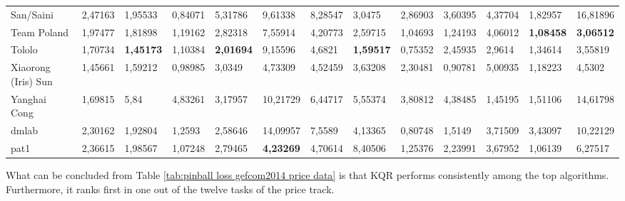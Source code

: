 \begin{table}[!ht]
\begin{adjustbox}{width=\textwidth}
\begin{tabular}{lllllllllllll}
  San/Saini                  & 2,47163          & 1,95533          & 0,84071 & 5,31786          & 9,61338          & 8,28547          & 3,0475           & 2,86903          & 3,60395          & 4,37704          & 1,82957          & 16,81896         \\
  Team Poland                & 1,97477          & 1,81898          & 1,19162          & 2,82318          & 7,55914          & 4,20773          & 2,59715          & 1,04693          & 1,24193          & 4,06012          & \textbf{1,08458} & \textbf{3,06512} \\
  Tololo                     & 1,70734          & \textbf{1,45173} & 1,10384          & \textbf{2,01694} & 9,15596          & 4,6821           & \textbf{1,59517} & 0,75352          & 2,45935          & 2,9614           & 1,34614          & 3,55819          \\
  Xiaorong (Iris) Sun        & 1,45661          & 1,59212          & 0,98985          & 3,0349           & 4,73309          & 4,52459          & 3,63208          & 2,30481          & 0,90781          & 5,00935          & 1,18223          & 4,5302           \\
  Yanghai Cong               & 1,69815          & 5,84             & 4,83261          & 3,17957          & 10,21729         & 6,44717          & 5,55374          & 3,80812          & 4,38485          & 1,45195          & 1,51106          & 14,61798         \\
  dmlab                      & 2,30162          & 1,92804          & 1,2593           & 2,58646          & 14,09957         & 7,5589           & 4,13365          & 0,80748          & 1,5149           & 3,71509          & 3,43097          & 10,22129         \\
  pat1                       & 2,36615          & 1,98567          & 1,07248          & 2,79465          & \textbf{4,23269} & 4,70614          & 8,40506          & 1,25376          & 2,23991          & 3,67952          & 1,06139          & 6,27517         
  
  \end{tabular}
    \end{adjustbox}
  \end{table}

What can be concluded from Table \ref{tab:pinball loss gefcom2014 price data} is that KQR performs consistently among the top algorithms. Furthermore, it ranks first in one out of the twelve tasks of the price track.

